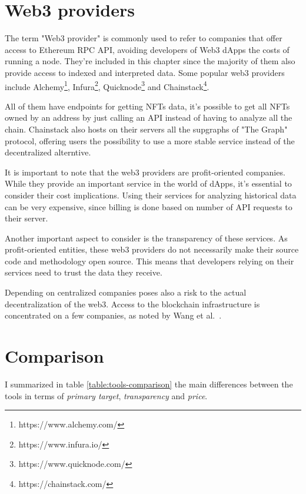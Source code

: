 \section{Web3 providers}

The term "Web3 provider" is commonly used to refer to companies that offer access to Ethereum RPC API, avoiding developers of Web3 dApps the costs of running a node. They're included in this chapter since the majority of them also provide access to indexed and interpreted data. Some popular web3 providers include Alchemy\footnote{https://www.alchemy.com/}, Infura\footnote{https://www.infura.io/}, Quicknode\footnote{https://www.quicknode.com/} and Chainstack\footnote{https://chainstack.com/}.

All of them have endpoints for getting NFTs data, it's possible to get all NFTs owned by an address by just calling an API instead of having to analyze all the chain. Chainstack also hosts on their servers all the supgraphs of "The Graph" protocol, offering users the possibility to use a more stable service instead of the decentralized alterntive.

It is important to note that the web3 providers are profit-oriented companies. While they provide an important service in the world of dApps, it's essential to consider their cost implications. Using their services for analyzing historical data can be very expensive, since billing is done based on number of API requests to their server.

Another important aspect to consider is the transparency of these services. As profit-oriented entities, these web3 providers do not necessarily make their source code and methodology open source. This means that developers relying on their services need to trust the data they receive. 

Depending on centralized companies poses also a risk to the actual decentralization of the web3. Access to the blockchain infrastructure is concentrated on a few companies, as noted by Wang et al.~\cite{wang2022exploring}.

\section{Comparison}

I summarized in table \ref{table:tools-comparison} the main differences between the tools in terms of \textit{primary target}, \textit{transparency} and \textit{price}.

